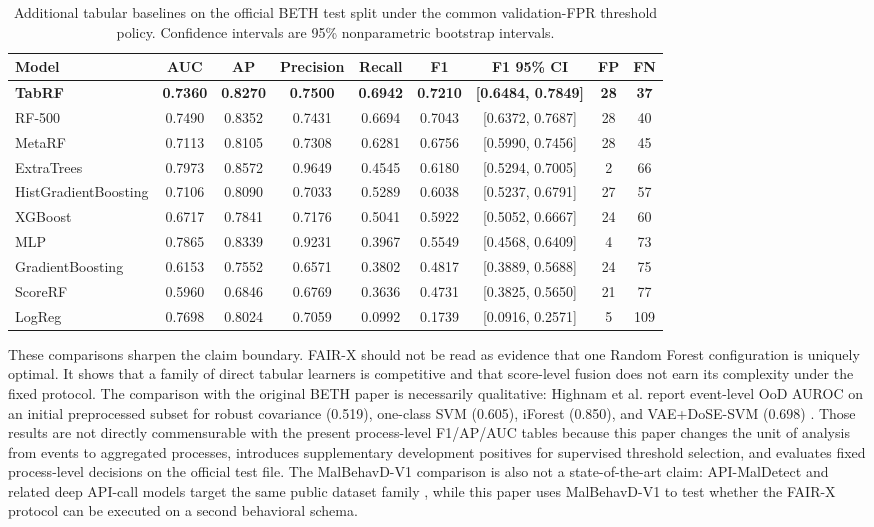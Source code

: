 \documentclass[10pt,journal,compsoc]{IEEEtran}
\begin{document}
\begin{table}[t]
\centering
\caption{Additional tabular baselines on the official BETH test split under the common validation-FPR threshold policy. Confidence intervals are 95\% nonparametric bootstrap intervals.}
\label{tab:sota_tabular}
\begin{tabular}{lcccccccc}
\toprule
\textbf{Model} & \textbf{AUC} & \textbf{AP} & \textbf{Precision} & \textbf{Recall} & \textbf{F1} & \textbf{F1 95\% CI} & \textbf{FP} & \textbf{FN} \\
\midrule
\textbf{TabRF} & \textbf{0.7360} & \textbf{0.8270} & \textbf{0.7500} & \textbf{0.6942} & \textbf{0.7210} & \textbf{[0.6484, 0.7849]} & \textbf{28} & \textbf{37} \\
RF-500 & 0.7490 & 0.8352 & 0.7431 & 0.6694 & 0.7043 & [0.6372, 0.7687] & 28 & 40 \\
MetaRF & 0.7113 & 0.8105 & 0.7308 & 0.6281 & 0.6756 & [0.5990, 0.7456] & 28 & 45 \\
ExtraTrees & 0.7973 & 0.8572 & 0.9649 & 0.4545 & 0.6180 & [0.5294, 0.7005] & 2 & 66 \\
HistGradientBoosting & 0.7106 & 0.8090 & 0.7033 & 0.5289 & 0.6038 & [0.5237, 0.6791] & 27 & 57 \\
XGBoost & 0.6717 & 0.7841 & 0.7176 & 0.5041 & 0.5922 & [0.5052, 0.6667] & 24 & 60 \\
MLP & 0.7865 & 0.8339 & 0.9231 & 0.3967 & 0.5549 & [0.4568, 0.6409] & 4 & 73 \\
GradientBoosting & 0.6153 & 0.7552 & 0.6571 & 0.3802 & 0.4817 & [0.3889, 0.5688] & 24 & 75 \\
ScoreRF & 0.5960 & 0.6846 & 0.6769 & 0.3636 & 0.4731 & [0.3825, 0.5650] & 21 & 77 \\
LogReg & 0.7698 & 0.8024 & 0.7059 & 0.0992 & 0.1739 & [0.0916, 0.2571] & 5 & 109 \\
\bottomrule
\end{tabular}
\end{table}

These comparisons sharpen the claim boundary. FAIR-X should not be read as evidence that one Random Forest configuration is uniquely optimal. It shows that a family of direct tabular learners is competitive and that score-level fusion does not earn its complexity under the fixed protocol. The comparison with the original BETH paper is necessarily qualitative: Highnam et al. report event-level OoD AUROC on an initial preprocessed subset for robust covariance (0.519), one-class SVM (0.605), iForest (0.850), and VAE+DoSE-SVM (0.698) \cite{highnam2021}. Those results are not directly commensurable with the present process-level F1/AP/AUC tables because this paper changes the unit of analysis from events to aggregated processes, introduces supplementary development positives for supervised threshold selection, and evaluates fixed process-level decisions on the official test file. The MalBehavD-V1 comparison is also not a state-of-the-art claim: API-MalDetect and related deep API-call models target the same public dataset family \cite{maniriho2023}, while this paper uses MalBehavD-V1 to test whether the FAIR-X protocol can be executed on a second behavioral schema.
\end{document}
